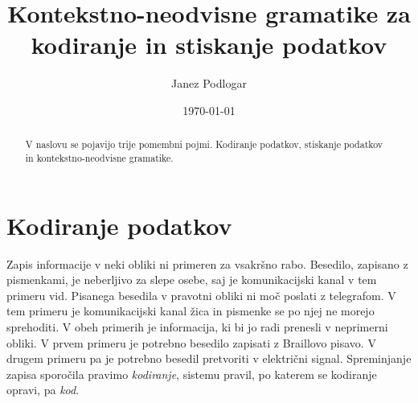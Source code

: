 \documentclass{amsart}
\title{Kontekstno-neodvisne gramatike za kodiranje in stiskanje podatkov}
\author{Janez Podlogar}
\date{\today}
\theoremstyle{definition} %
\theoremstyle{plain} %
\begin{document}
\begin{abstract}
    V naslovu se pojavijo trije pomembni pojmi. Kodiranje podatkov, stiskanje
    podatkov in kontekstno-neodvisne gramatike.
\end{abstract}

\maketitle

\section{Kodiranje podatkov}

Zapis informacije v neki obliki ni primeren za vsakršno rabo. Besedilo, zapisano z 
pismenkami, je neberljivo za slepe osebe, saj je komunikacijski kanal v tem primeru
vid. Pisanega besedila v pravotni obliki ni moč poslati z telegrafom. V tem primeru
je komunikacijski kanal žica in pismenke se po njej ne morejo sprehoditi. V obeh 
primerih je informacija, ki bi jo radi prenesli v neprimerni obliki. V prvem 
primeru je potrebno besedilo zapisati z Braillovo pisavo. V drugem primeru pa je 
potrebno besedil pretvoriti v električni signal. Spreminjanje zapisa sporočila
pravimo \textit{kodiranje}, sistemu pravil, po katerem se kodiranje opravi,
pa \textit{kod}. 
\end{document}
